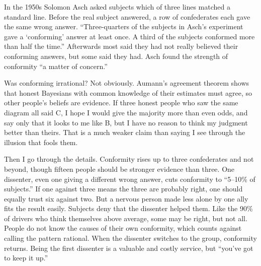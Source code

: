 
In the 1950s Solomon Asch asked subjects which of three lines matched a standard line. Before the real subject answered, a row of confederates each gave the same wrong answer. ``Three-quarters of the subjects in Asch's experiment gave a `conforming' answer at least once. A third of the subjects conformed more than half the time.'' Afterwards most said they had not really believed their conforming answers, but some said they had. Asch found the strength of conformity ``a matter of concern.'' 

Was conforming irrational? Not obviously. Aumann's agreement theorem shows that honest Bayesians with common knowledge of their estimates must agree, so other people's beliefs are evidence.  If three honest people who saw the same diagram all said C, I hope I would give the majority more than even odds, and say only that it looks to me like B, but I have no reason to think my judgment better than theirs. That is a much weaker claim than saying I see through the illusion that fools them. 

Then I go through the details. Conformity rises up to three confederates and not beyond, though fifteen people should be stronger evidence than three. One dissenter, even one giving a different wrong answer, cuts conformity to ``5–10\% of subjects.'' If one against three means the three are probably right, one should equally trust six against two. But a nervous person made less alone by one ally fits the result easily.  Subjects deny that the dissenter helped them. Like the 90\% of drivers who think themselves above average, some may be right, but not all. People do not know the causes of their own conformity, which counts against calling the pattern rational. When the dissenter switches to the group, conformity returns. Being the first dissenter is a valuable and costly service, but ``you've got to keep it up.'' 


